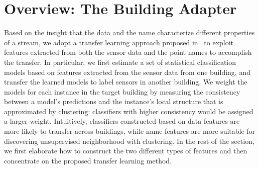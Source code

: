 \section{Overview: The Building Adapter}
Based on the insight that the data and the name characterize different properties of a stream, we adopt a transfer learning approach proposed in~\cite{lwe} to exploit features extracted from both the sensor data and the point names to accomplish the transfer. 
In particular, we first estimate a set of statistical classification models based on features extracted from the sensor data from one building, and transfer the learned models to label sensors in another building. 
We weight the models for each instance in the target building by measuring the consistency between a model's predictions and the instance's local structure that is approximated by clustering: classifiers with higher consistency would be assigned a larger weight. 
Intuitively, classifiers constructed based on data features are more likely to transfer across buildings, while name features are more suitable for discovering unsupervised neighborhood with clustering. 
In the rest of the section, we first elaborate how to construct the two different types of features and then concentrate on the proposed transfer learning method.





